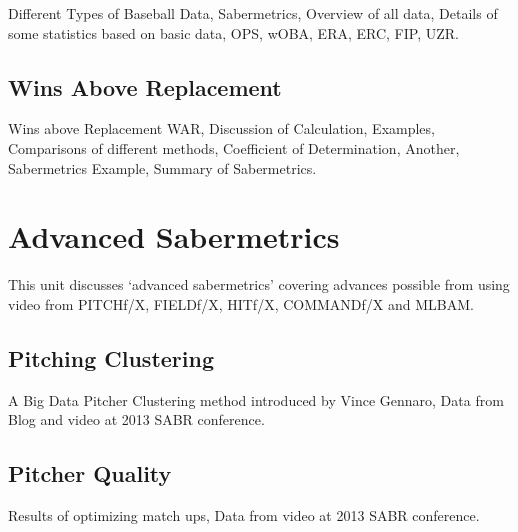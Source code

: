 Different Types of Baseball Data, Sabermetrics, Overview of all data,
Details of some statistics based on basic data, OPS, wOBA, ERA, ERC,
FIP, UZR.





\subsection{Wins Above Replacement}\label{wins-above-replacement}

Wins above Replacement WAR, Discussion of Calculation, Examples,
Comparisons of different methods, Coefficient of Determination, Another,
Sabermetrics Example, Summary of Sabermetrics.






\section{Advanced  Sabermetrics}\label{sports-informatics-ii-sabermetrics-advanced}

This unit discusses `advanced sabermetrics' covering advances possible
from using video from PITCHf/X, FIELDf/X, HITf/X, COMMANDf/X and MLBAM.




\subsection{Pitching Clustering}\label{pitching-clustering}

A Big Data Pitcher Clustering method introduced by Vince Gennaro, Data
from Blog and video at 2013 SABR conference.




\subsection{Pitcher Quality}\label{pitcher-quality}

Results of optimizing match ups, Data from video at 2013 SABR
conference.





